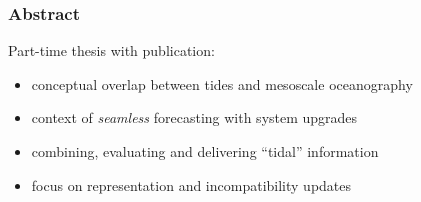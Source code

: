 \begin{frame}
\frametitle{Abstract}

Part-time thesis with publication:
\begin{itemize}
    \item conceptual overlap between tides and mesoscale oceanography
    \item context of \emph{seamless} forecasting with system upgrades
    \item combining, evaluating and delivering ``tidal'' information
    \item focus on representation and incompatibility
     updates 
\end{itemize}

\end{frame}